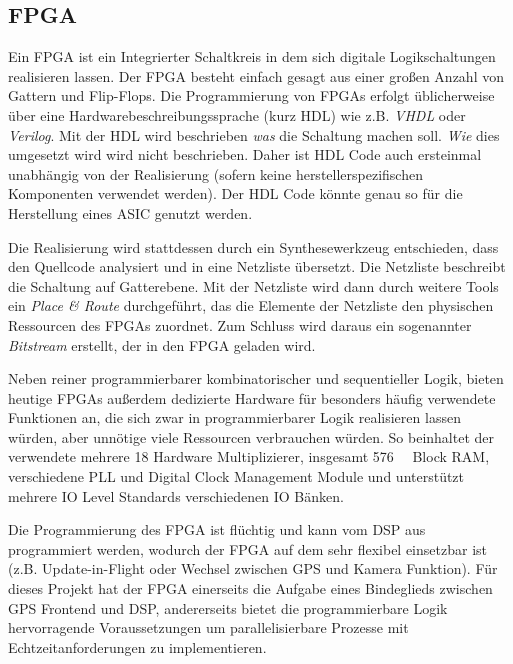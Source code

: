
\subsection{FPGA}
Ein FPGA ist ein Integrierter Schaltkreis in dem sich digitale Logikschaltungen realisieren lassen. Der FPGA besteht einfach gesagt aus einer großen Anzahl von Gattern und Flip-Flops. Die Programmierung von FPGAs erfolgt üblicherweise über eine Hardwarebeschreibungssprache (kurz HDL) wie z.B. \emph{VHDL} oder \emph{Verilog}. Mit der HDL wird beschrieben \emph{was} die Schaltung machen soll. \emph{Wie} dies umgesetzt wird wird nicht beschrieben. Daher ist HDL Code auch ersteinmal unabhängig von der Realisierung (sofern keine herstellerspezifischen Komponenten verwendet werden). Der HDL Code könnte genau so für die Herstellung eines ASIC genutzt werden.

Die Realisierung wird stattdessen durch ein Synthesewerkzeug entschieden, dass den Quellcode analysiert und in eine Netzliste übersetzt. Die Netzliste beschreibt die Schaltung auf Gatterebene. Mit der Netzliste wird dann durch weitere Tools ein \emph{Place \& Route} durchgeführt, das die Elemente der Netzliste den physischen Ressourcen des FPGAs zuordnet. Zum Schluss wird daraus ein sogenannter \emph{Bitstream} erstellt, der in den FPGA geladen wird.

Neben reiner programmierbarer kombinatorischer und sequentieller Logik, bieten heutige FPGAs außerdem dedizierte Hardware für besonders häufig verwendete Funktionen an, die sich zwar in programmierbarer Logik realisieren lassen würden, aber unnötige viele Ressourcen verbrauchen würden. So beinhaltet der verwendete \comfpga mehrere \SI{18}{\bit} Hardware Multiplizierer, insgesamt \SI{576}{\kilo\bit} Block RAM, verschiedene PLL und Digital Clock Management Module und unterstützt mehrere IO Level Standards verschiedenen IO Bänken.

Die Programmierung des FPGA ist flüchtig und kann vom DSP aus programmiert werden, wodurch der FPGA auf dem \comboard sehr flexibel einsetzbar ist (z.B. Update-in-Flight oder Wechsel zwischen GPS und Kamera Funktion). Für dieses Projekt hat der FPGA einerseits die Aufgabe eines Bindeglieds zwischen GPS Frontend und DSP, andererseits bietet die programmierbare Logik hervorragende Voraussetzungen um parallelisierbare Prozesse mit Echtzeitanforderungen zu implementieren.